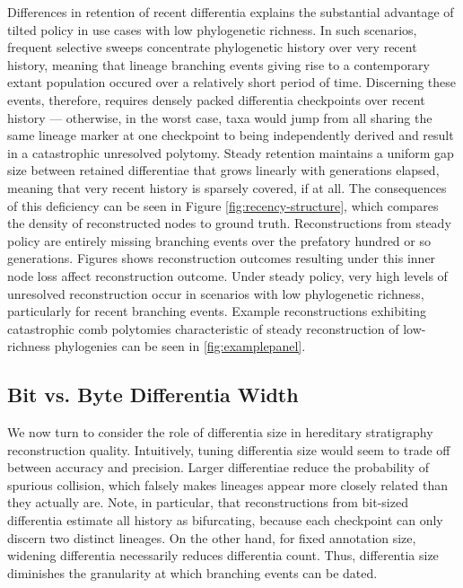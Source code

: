 Differences in retention of recent differentia explains the substantial advantage of tilted policy in use cases with low phylogenetic richness.
In such scenarios, frequent selective sweeps concentrate phylogenetic history over very recent history, meaning that lineage branching events giving rise to a contemporary extant population occured over a relatively short period of time.
Discerning these events, therefore, requires densely packed differentia checkpoints over recent history --- otherwise, in the worst case, taxa would jump from all sharing the same lineage marker at one checkpoint to being independently derived and result in a catastrophic unresolved polytomy.
Steady retention maintains a uniform gap size between retained differentiae that grows linearly with generations elapsed, meaning that very recent history is sparsely covered, if at all.
The consequences of this deficiency can be seen in Figure \ref{fig:recency-structure}, which compares the density of reconstructed nodes to ground truth.
Reconstructions from steady policy are entirely missing branching events over the prefatory hundred or so generations.
Figures  shows reconstruction outcomes resulting under this inner node loss affect reconstruction outcome.
Under steady policy, very high levels of unresolved reconstruction occur in scenarios with low phylogenetic richness, particularly for recent branching events.
Example reconstructions exhibiting catastrophic comb polytomies characteristic of steady reconstruction of low-richness phylogenies can be seen in \ref{fig:examplepanel}.

\subsection{Bit vs. Byte Differentia Width} \label{sec:bit-vs-byte}



We now turn to consider the role of differentia size in hereditary stratigraphy reconstruction quality.
Intuitively, tuning differentia size would seem to trade off between accuracy and precision.
Larger differentiae reduce the probability of spurious collision, which falsely makes lineages appear more closely related than they actually are.
Note, in particular, that reconstructions from bit-sized differentia estimate all history as bifurcating, because each checkpoint can only discern two distinct lineages.
On the other hand, for fixed annotation size, widening differentia necessarily reduces differentia count.
Thus, differentia size diminishes the granularity at which branching events can be dated.

